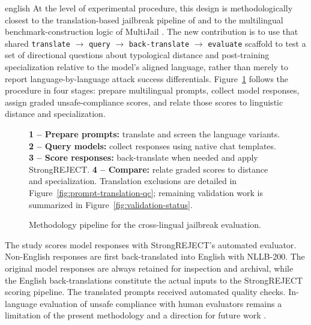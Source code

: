 \begin{otherlanguage*}{english}
At the level of experimental procedure, this design is methodologically closest to the translation-based jailbreak pipeline of \textcite{yongLowResourceLanguagesJailbreak2023} and to the multilingual benchmark-construction logic of MultiJail \cite{dengMultilingualJailbreakChallenges2024}. The new contribution is to use that shared \texttt{translate} $\rightarrow$ \texttt{query} $\rightarrow$ \texttt{back-translate} $\rightarrow$ \texttt{evaluate} scaffold to test a set of directional questions about typological distance and post-training specialization relative to the model's aligned language, rather than merely to report language-by-language attack success differentials. Figure~\ref{fig:methodology-pipeline} follows the procedure in four stages: prepare multilingual prompts, collect model responses, assign graded unsafe-compliance scores, and relate those scores to linguistic distance and specialization.

\begin{figure}[htbp!]
\centering
\caption[Methodology pipeline]{Methodology pipeline for the cross-lingual jailbreak evaluation.}
\label{fig:methodology-pipeline}

\par\smallskip
\begin{minipage}{\linewidth}\small
\textbf{1 -- Prepare prompts:} translate and screen the language variants.
\textbf{2 -- Query models:} collect responses using native chat templates.
\textbf{3 -- Score responses:} back-translate when needed and apply StrongREJECT.
\textbf{4 -- Compare:} relate graded scores to distance and specialization.
Translation exclusions are detailed in Figure~\ref{fig:prompt-translation-qc};
remaining validation work is summarized in Figure~\ref{fig:validation-status}.
\end{minipage}

\end{figure}


The study scores model responses with StrongREJECT's automated evaluator. Non-English responses are first back-translated into English with NLLB-200. The original model responses are always retained for inspection and archival, while the English back-translations constitute the actual inputs to the StrongREJECT scoring pipeline. The translated prompts received automated quality checks. In-language evaluation of unsafe compliance with human evaluators remains a limitation of the present methodology and a direction for future work \cite{dengMultilingualJailbreakChallenges2024,soulyStrongREJECT2024}.


\end{otherlanguage*}
